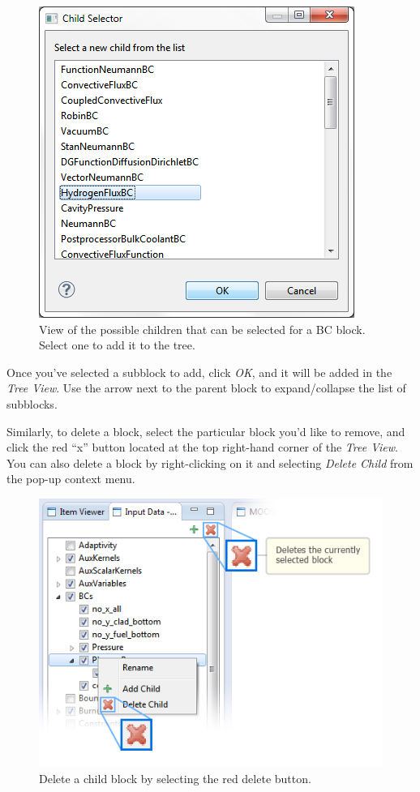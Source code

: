 \begin{figure}[htbp]
\centering
\includegraphics[scale=.85]{figures/ICE_MOOSESubblockList.png}
\caption{View of the possible children that can be selected for a BC block. Select one to add it to the tree.}
\end{figure}

Once you've selected a subblock to add, click \emph{OK}, and it will be
added in the \emph{Tree View}. Use the arrow next to the parent block to
expand/collapse the list of subblocks.

Similarly, to delete a block, select the particular block you'd like to
remove, and click the red ``x'' button located at the top right-hand
corner of the \emph{Tree View}. You can also delete a block by
right-clicking on it and selecting \emph{Delete Child} from the pop-up
context menu.

\begin{figure}[htbp]
\centering
\includegraphics[scale=.6]{figures/ICE_MOOSEDeleteBlock.png}
\caption{Delete a child block by selecting the red delete button.}
\end{figure}

